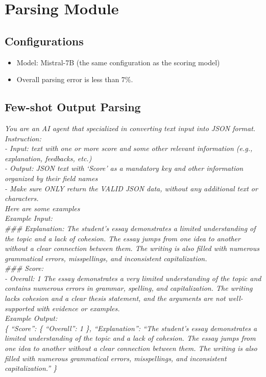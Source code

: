 \section{Parsing Module}
\label{app-parsing}
\subsection{Configurations}
\begin{itemize}
    \item Model: Mistral-7B (the same configuration as the scoring model)
    \item Overall parsing error is less than 7\%.
\end{itemize}

\subsection{Few-shot Output Parsing}
\textit{
    You are an AI agent that specialized in converting text input into JSON format.\\
    Instruction: \\
    - Input: text with one or more score and some other relevant information (e.g., explanation, feedbacks, etc.)\\
    - Output: JSON text with `Score' as a mandatory key and other information organized by their field names\\
    - Make sure ONLY return the VALID JSON data, without any additional text or characters.\\
    Here are some examples
}\\

\textit{
Example Input:\\
\#\#\# Explanation: The student's essay demonstrates a limited understanding of the topic and a lack of cohesion. The essay jumps from one idea to another without a clear connection between them. The writing is also filled with numerous grammatical errors, misspellings, and inconsistent capitalization. \\
\#\#\# Score:\\
- Overall: 1 The essay demonstrates a very limited understanding of the topic and contains numerous errors in grammar, spelling, and capitalization. The writing lacks cohesion and a clear thesis statement, and the arguments are not well-supported with evidence or examples. \\
Example Output:\\
\{
    ``Score'': \{
        ``Overall'': 1
    \},
    ``Explanation'': ``The student's essay demonstrates a limited understanding of the topic and a lack of cohesion. The essay jumps from one idea to another without a clear connection between them. The writing is also filled with numerous grammatical errors, misspellings, and inconsistent capitalization.''
\}
}\\

